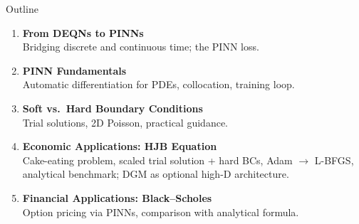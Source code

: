 \documentclass[aspectratio=169,11pt]{beamer}
\begin{document}
\begin{frame}{Outline}
\begin{enumerate}
    \item \textbf{From DEQNs to PINNs}\\
    {\small Bridging discrete and continuous time; the PINN loss.}

    \vspace{0.4em}
    \item \textbf{PINN Fundamentals}\\
    {\small Automatic differentiation for PDEs, collocation, training loop.}

    \vspace{0.4em}
    \item \textbf{Soft vs.\ Hard Boundary Conditions}\\
    {\small Trial solutions, 2D Poisson, practical guidance.}

    \vspace{0.4em}
    \item \textbf{Economic Applications: HJB Equation}\\
    {\small Cake-eating problem, scaled trial solution + hard BCs, Adam $\to$ L-BFGS, analytical benchmark; DGM as optional high-D architecture.}

    \vspace{0.4em}
    \item \textbf{Financial Applications: Black--Scholes}\\
    {\small Option pricing via PINNs, comparison with analytical formula.}
\end{enumerate}
\end{frame}
\end{document}
